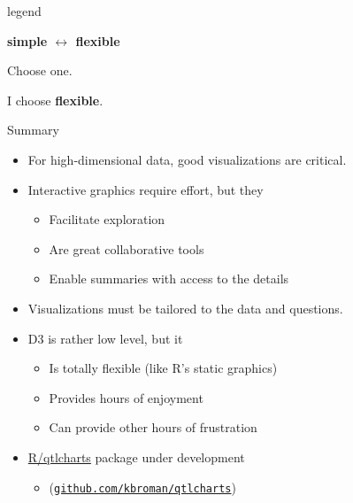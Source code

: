 \documentclass[final,plain]{beamer}
\newlength{\onecolwid}
\newcommand{\bi}{\begin{itemize}}
\newcommand{\ei}{\end{itemize}}
\newcommand{\ttsm}{\tt \small}
\newcommand{\bluebold}{\color{dblue} \bf}
\newcommand{\coltwovsep}{\vspace{35.5mm}}
\newcommand{\hilit}{\color{mypurple}}
\begin{document}
\begin{frame}[t]
\begin{columns}[t]
\begin{column}{\onecolwid}
  \coltwovsep %

        \begin{beamercolorbox}[sep=1em, wd=\onecolwid]{legend} \rmfamily

          \centerline{\bluebold \Large simple \quad
            $\longleftrightarrow$ \quad flexible}

           \vspace{48pt}

           \hfill \begin{minipage}{0.3\onecolwid}
            Choose one.

            I choose {\bluebold flexible}.
            \end{minipage}

        \end{beamercolorbox}

  \coltwovsep %

    \begin{exampleblock}{\Large Summary}
        \bi \itemsep18pt
        \item For high-dimensional data, good visualizations are
          {\hilit critical}.
        \item {\hilit Interactive} graphics require effort, but they
          \bi
          \item Facilitate exploration
          \item Are great collaborative tools
          \item Enable summaries with access to the details
          \ei
        \item Visualizations must be {\hilit tailored} to
          the data and questions.
        \item {\hilit D3} is rather low level, but it
          \bi
          \item Is totally flexible (like R's static graphics)
          \item Provides hours of enjoyment
          \item Can provide other hours of frustration
          \ei
        \item \href{http://github.com/kbroman/qtlcharts}{R/qtlcharts}
          package under development
          \bi
          \item[] {\small (\href{http://github.com/kbroman/qtlcharts}{\ttsm github.com/kbroman/qtlcharts})}
          \ei
        \ei
    \end{exampleblock}

  \coltwovsep %


\end{column}
\end{columns}
\end{frame}
\end{document}
